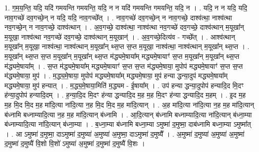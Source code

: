 \documentclass[17pt]{extarticle}
\begin{document}
1. ग॒म॒य॒न्ति॒ यदि॒ यदि॑ गमयन्ति गमयन्ति॒ यदि॒ न न यदि॑ गमयन्ति गमयन्ति॒ यदि॒ न । . यदि॒ न न यदि॒ यदि॒ नाव॒गच्छे॑ दव॒गच्छे॒न् न यदि॒ यदि॒ नाव॒गच्छे᳚त् । . नाव॒गच्छे॑ दव॒गच्छे॒न् न नाव॒गच्छे॒ दाश्व॑त्था॒ नाश्व॑त्था नव॒गच्छे॒न् न नाव॒गच्छे॒ दाश्व॑त्थान् । . अ॒व॒गच्छे॒ दाश्व॑त्था॒ नाश्व॑त्था नव॒गच्छे॑ दव॒गच्छे॒ दाश्व॑त्थान् म॒यूखा᳚न् म॒यूखा॒ नाश्व॑त्था नव॒गच्छे॑ दव॒गच्छे॒ दाश्व॑त्थान् म॒यूखान्॑ । . अ॒व॒गच्छे॒दित्य॑व - गच्छे᳚त् । . आश्व॑त्थान् म॒यूखा᳚न् म॒यूखा॒ नाश्व॑त्था॒ नाश्व॑त्थान् म॒यूखा᳚न् थ्स॒प्त स॒प्त म॒यूखा॒ नाश्व॑त्था॒ नाश्व॑त्थान् म॒यूखा᳚न् थ्स॒प्त । . म॒यूखा᳚न् थ्स॒प्त स॒प्त म॒यूखा᳚न् म॒यूखा᳚न् थ्स॒प्त म॑द्ध्यमे॒षाया᳚म् मद्ध्यमे॒षायाꣳ॑ स॒प्त म॒यूखा᳚न् म॒यूखा᳚न् थ्स॒प्त म॑द्ध्यमे॒षाया᳚म् । . स॒प्त म॑द्ध्यमे॒षाया᳚म् मद्ध्यमे॒षायाꣳ॑ स॒प्त स॒प्त म॑द्ध्यमे॒षाया॒ मुपोप॑ मद्ध्यमे॒षायाꣳ॑ स॒प्त स॒प्त म॑द्ध्यमे॒षाया॒ मुप॑ । . म॒द्ध्य॒मे॒षाया॒ मुपोप॑ मद्ध्यमे॒षाया᳚म् मद्ध्यमे॒षाया॒ मुप॑ हन्या द्धन्या॒दुप॑ मद्ध्यमे॒षाया᳚म् मद्ध्यमे॒षाया॒ मुप॑ हन्यात् । . म॒द्ध्य॒मे॒षाया॒मिति॑ म॒द्ध्यम - ई॒षाया᳚म् । . उप॑ हन्या द्धन्या॒दुपोप॑ हन्यादि॒द मि॒दꣳ ह॑न्या॒दुपोप॑ हन्यादि॒दम् । . ह॒न्या॒दि॒द मि॒दꣳ ह॑न्या द्धन्यादि॒द म॒ह म॒ह मि॒दꣳ ह॑न्या द्धन्यादि॒द म॒हम् । . इ॒द म॒ह म॒ह मि॒द मि॒द म॒ह मा॑दि॒त्या ना॑दि॒त्या न॒ह मि॒द मि॒द म॒ह मा॑दि॒त्यान् । . अ॒ह मा॑दि॒त्या ना॑दि॒त्या न॒ह म॒ह मा॑दि॒त्यान् ब॑ध्नामि बध्नाम्यादि॒त्या न॒ह म॒ह मा॑दि॒त्यान् ब॑ध्नामि । . आ॒दि॒त्यान् ब॑ध्नामि बध्नाम्यादि॒त्या ना॑दि॒त्यान् ब॑ध्ना॒म्या ब॑ध्नाम्यादि॒त्या ना॑दि॒त्यान् ब॑ध्ना॒म्या । . ब॒ध्ना॒म्या ब॑ध्नामि बध्ना॒म्या ऽमुष्मा॑ द॒मुष्मा॒ दाब॑ध्नामि बध्ना॒म्या ऽमुष्मा᳚त् । . आ ऽमुष्मा॑ द॒मुष्मा॒ दाऽमुष्मा॑ द॒मुष्या॑ अ॒मुष्या॑ अ॒मुष्मा॒ दाऽमुष्मा॑ द॒मुष्यै᳚ । . अ॒मुष्मा॑ द॒मुष्या॑ अ॒मुष्या॑ अ॒मुष्मा॑ द॒मुष्मा॑ द॒मुष्यै॑ वि॒शो वि॒शो॑ ऽमुष्या॑ अ॒मुष्मा॑ द॒मुष्मा॑ द॒मुष्यै॑ वि॒शः । \newline
\end{document}
